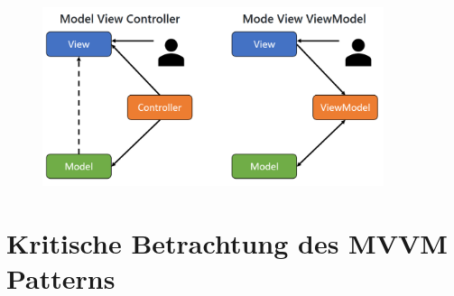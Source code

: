 \documentclass[titlepage=false,12pt]{scrreprt}
\begin{document}
\begin{figure}
	\includegraphics[width=10cm]{MVC_vs_MVVM.PNG}
\end{figure}

\chapter{Kritische Betrachtung des MVVM Patterns}
\end{document}
